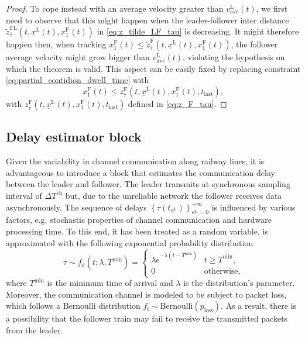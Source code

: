 \documentclass[letterpaper, 10 pt, conference]{ieeeconf}
\theoremstyle{definition}
\theoremstyle{nopoint}
\begin{document}
\begin{proof}
To cope instead with an average velocity greater than $v_{\mathrm{ave}}^\mathrm{L}(t)$, we first need to observe that this might happen when the leader-follower inter distance $\tilde{z}^{\mathrm{FL}}_{\bar{\tau}} (t,\underline{x}^\mathrm{L}(t),x_1^\mathrm{F}(t))$ in \eqref{eq:z_tilde_LF_tau} is decreasing. It might therefore happen then, when tracking $x_1^\mathrm{F}(t)\leq \tilde{z}^{\mathrm{F}}_{\bar{\tau}} (t,\underline{x}^\mathrm{L}(t),x_1^\mathrm{F}(t))$, the follower average velocity might grow bigger than $v_{\mathrm{ave}}^\mathrm{L}(t)$, violating the hypothesis on which the theorem is valid. This aspect can be easily fixed by replacing constraint \eqref{eq:partial_contidion_dwell_time} with
\begin{equation}\label{eq:dwell_time}
x_1^\mathrm{F}(t)\leq z_{\bar{\tau}}^\mathrm{F}(t,\underline{x}^\mathrm{L}(t),x_1^\mathrm{F}(t),t_{\mathrm{last}}),
\end{equation}
with $z_{\bar{\tau}}^\mathrm{F}(t,\underline{x}^\mathrm{L}(t),x_1^\mathrm{F}(t),t_{\mathrm{last}})$ defined in \eqref{eq:z_F_tau}.
\end{proof}

\subsection{Delay estimator block}
\label{subsec:delayEstimator}  


Given the variability in channel communication along railway lines, it is advantageous to introduce a block that estimates the communication delay between the leader and follower. The leader transmits at synchronous sampling interval of $\Delta T^\mathrm{ch}$ but, due to the unreliable network the follower receives data asynchronously. The sequence of delays $ \left\{ \tau(t_{\kappa^\mathrm{L}})\right\}_{\kappa^\mathrm{L}=0}^{+\infty}$ is influenced by various factors, e.g. stochastic properties of channel communication and hardware processing time. To this end, it has been treated as a random variable,  is  approximated with the following exponential probability distribution 
%
\begin{equation} \label{eq:pdfDelay}
	\tau \sim f_{\mathrm{d}} (t;\lambda, T^\mathrm{min}) = \begin{cases}\lambda e^{-\lambda (t-T^{\min})} & t \geq T^{\min}, \\ 0 & \text{otherwise},\end{cases}
\end{equation}
where $T^\mathrm{min}$ is the minimum time of arrival and $\lambda$ is the distribution's parameter.
Moreover, the communication channel is modeled to be subject to packet loss, which follows a Bernoulli distribution \( f_{\mathrm{l}} \sim \textrm{Bernoulli}(p_\mathrm{loss}) \). As a result, there is a possibility that the follower train may fail to receive the transmitted packets from the leader.
\end{document}
